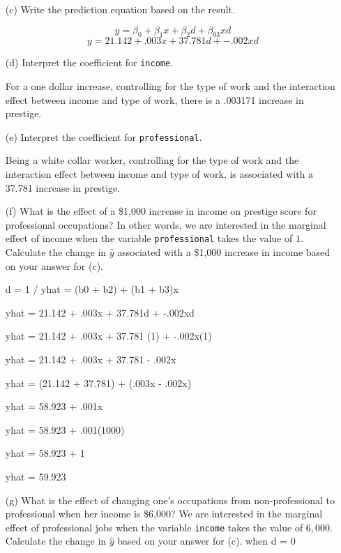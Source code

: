 \documentclass[12pt,letterpaper]{article}
\begin{document}
\begin{enumerate}
	\vspace{6cm}
	\item [(c)]
	Write the prediction equation based on the result.
	
		$$y = \beta_0 + \beta_1 x + \beta_2d + \beta_03xd$$
	$$y =21.142 + .003x + 37.781d + -.002xd$$
	\vspace{1cm}
	
	\item [(d)]
	Interpret the coefficient for \texttt{income}.
	\vspace{.5cm}
	
	For a one dollar increase, controlling for the type of work and the 
	interaction effect between income and type of work, there is a .003171
	increase in prestige.
	
	\vspace{1cm}	
	\item [(e)]
	Interpret the coefficient for \texttt{professional}.
	\vspace{.5cm}
	
	Being a white collar worker, controlling for the type of work and the 
	interaction effect between income and type of work, is associated with 
	a 37.781 increase in prestige.
	
\vspace{1cm}
	\item [(f)]
	What is the effect of a \$1,000 increase in income on prestige score for professional occupations? In other words, we are interested in the marginal effect of income when the variable \texttt{professional} takes the value of $1$. Calculate the change in $\hat{y}$ associated with a \$1,000 increase in income based on your answer for (c).
	\vspace{.5cm}
	
	d = 1 / yhat = (b0 + b2) + (b1 + b3)x
	
	 yhat = 21.142 + .003x + 37.781d + -.002xd
	 
	yhat = 21.142 + .003x + 37.781 (1) + -.002x(1)
	
	yhat = 21.142 + .003x + 37.781 - .002x 
	
	yhat = (21.142 + 37.781) + (.003x - .002x)
	
	yhat = 58.923 + .001x 
	
	yhat = 58.923 + .001(1000)
	
	yhat = 58.923 + 1
	
	yhat = 59.923
	
\newpage
	
	\item [(g)]
	What is the effect of changing one's occupations from non-professional to professional when her income is \$6,000? We are interested in the marginal effect of professional jobs when the variable \texttt{income} takes the value of $6,000$. Calculate the change in $\hat{y}$ based on your answer for (c).
	\vspace{.5cm}
	 when d = 0
	 

\end{enumerate}
\end{document}
